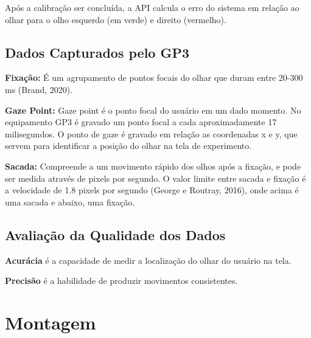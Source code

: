 Após a calibração ser concluída, a API calcula o erro do sistema em relação ao olhar para o olho esquerdo (em verde) 
e direito (vermelho). 

\subsection{Dados Capturados pelo GP3}

\textbf{Fixação:} É um agrupamento de pontos focais do olhar que duram entre 20-300 ms (Brand, 2020).

\textbf{Gaze Point:} Gaze point é o ponto focal do usuário em um dado momento. No equipamento GP3 é gravado um ponto focal a cada aproximadamente 17 milisegundos.
O ponto de gaze é gravado em relação as coordenadas x e y, que servem para identificar a posição do olhar na tela de experimento. 

\textbf{Sacada:} Compreende a um movimento rápido dos olhos após a fixação, e pode ser medida através de pixels por segundo.
O valor limite entre sacada e fixação é a velocidade de 1.8 pixels por segundo (George e Routray, 2016), onde acima
é uma sacada e abaixo, uma fixação.



\subsection{Avaliação da Qualidade dos Dados}

\textbf{Acurácia} é a capacidade de medir a localização do olhar do usuário na tela. 

\textbf{Precisão} é a habilidade de produzir movimentos consistentes. 

\section{Montagem}

